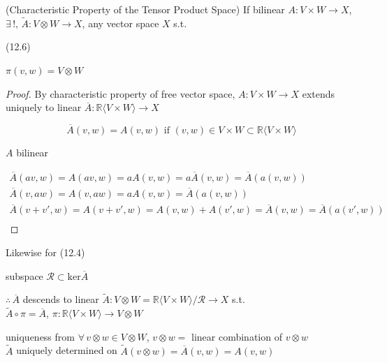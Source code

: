 \begin{proposition}[12.7] (Characteristic Property of the Tensor Product Space)
  If bilinear $A: V \times W \to X$, $\exists \, !, \, \widetilde{A} : V\otimes W \to X$, any vector space $X$  s.t.
  (12.6)

$\pi(v,w) = V\otimes W$
\end{proposition}

\begin{proof}
By characteristic property of free vector space, $A: V\times W \to X$ extends uniquely to linear $\overline{A} : \mathbb{R} \langle V \times W \rangle \to X$

\[
\overline{A}(v,w) = A(v,w) \text{ if } (v,w) \in V\times W \subset \mathbb{R}\langle V \times W \rangle
\]

$A$ bilinear

\[
\begin{aligned}
  \overline{A}(av,w) = A(av,w) = aA(v,w) = a\overline{A}(v,w) = \overline{A}(a(v,w)) \\ 
  \overline{A}(v,aw) = A(v,aw) = aA(v,w)  = \overline{A}(a(v,w)) \\ 
  \overline{A}(v+v',w)  = A(v+v',w) = A(v,w) +  A(v',w) = \overline{A}(v,w) = \overline{A}(a(v',w)) \\ 
\end{aligned}
\]
\end{proof}

Likewise for (12.4) 

subspace $\mathcal{R} \subset \text{ker}{\overline{A}}$

$\therefore \, \overline{A}$ descends to linear $\widetilde{A} : V\otimes W = \mathbb{R} \langle V\times W \rangle / \mathcal{R} \to X$ s.t. \\
$\widetilde{A} \circ \pi = \overline{A}$, $\pi: \mathbb{R}\langle V \times W \rangle \to V\otimes W$

uniqueness from $\forall \, v \otimes w \in V \otimes W$, $v\otimes w =$ linear combination of $v\otimes w$ \\
$\widetilde{A}$ uniquely determined on $\widetilde{A}(v\otimes w) = \overline{A}(v,w) = A(v,w)$


